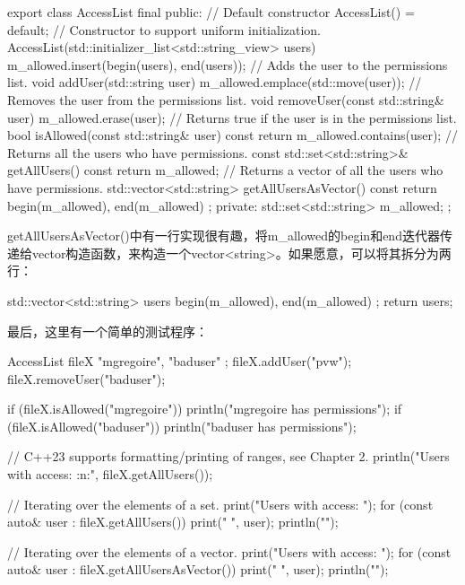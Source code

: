 \begin{cpp}
export class AccessList final
{
    public:
        // Default constructor
        AccessList() = default;
        // Constructor to support uniform initialization.
        AccessList(std::initializer_list<std::string_view> users)
        {
            m_allowed.insert(begin(users), end(users));
        }
        // Adds the user to the permissions list.
        void addUser(std::string user)
        {
            m_allowed.emplace(std::move(user));
        }
        // Removes the user from the permissions list.
        void removeUser(const std::string& user)
        {
            m_allowed.erase(user);
        }
        // Returns true if the user is in the permissions list.
        bool isAllowed(const std::string& user) const
        {
            return m_allowed.contains(user);
        }
        // Returns all the users who have permissions.
        const std::set<std::string>& getAllUsers() const
        {
            return m_allowed;
        }
        // Returns a vector of all the users who have permissions.
        std::vector<std::string> getAllUsersAsVector() const
        {
            return { begin(m_allowed), end(m_allowed) };
        }
    private:
        std::set<std::string> m_allowed;
};
\end{cpp}

getAllUsersAsVector()中有一行实现很有趣，将m\_allowed的begin和end迭代器传递给vector构造函数，来构造一个vector<string>。如果愿意，可以将其拆分为两行：

\begin{cpp}
std::vector<std::string> users { begin(m_allowed), end(m_allowed) };
return users;
\end{cpp}

最后，这里有一个简单的测试程序：

\begin{cpp}
AccessList fileX { "mgregoire", "baduser" };
fileX.addUser("pvw");
fileX.removeUser("baduser");

if (fileX.isAllowed("mgregoire")) { println("mgregoire has permissions"); }
if (fileX.isAllowed("baduser")) { println("baduser has permissions"); }

// C++23 supports formatting/printing of ranges, see Chapter 2.
println("Users with access: {:n:}", fileX.getAllUsers());

// Iterating over the elements of a set.
print("Users with access: ");
for (const auto& user : fileX.getAllUsers()) { print("{} ", user); }
println("");

// Iterating over the elements of a vector.
print("Users with access: ");
for (const auto& user : fileX.getAllUsersAsVector()) { print("{} ", user); }
println("");
\end{cpp}

